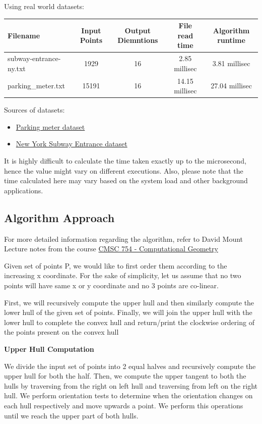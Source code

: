 Using real world datasets:

\begin{longtable}[]{@{}lcccc@{}}
\toprule
Filename & Input Points & Output Diemntions & File read time & Algorithm
runtime\tabularnewline
\midrule
\endhead
subway-entrance-ny.txt & 1929 & 16 & 2.85 millisec & 3.81
millisec\tabularnewline
parking\_meter.txt & 15191 & 16 & 14.15 millisec & 27.04
millisec\tabularnewline
\bottomrule
\end{longtable}

Sources of datasets:

\begin{itemize}
\tightlist
\item
  \href{https://data.world/city-of-ny/5jsj-cq4s}{Parking meter dataset}
\item
  \href{https://data.world/new-york-city/subway-entrances}{New York
  Subway Entrance dataset}
\end{itemize}

It is highly difficult to calculate the time taken exactly up to the
microsecond, hence the value might vary on different executions. Also,
please note that the time calculated here may vary based on the system
load and other background applications.

\hypertarget{algorithm-approach}{%
\subsection{Algorithm Approach}\label{algorithm-approach}}

For more detailed information regarding the algorithm, refer to David
Mount Lecture notes from the course
\href{https://www.cs.umd.edu/class/spring2020/cmsc754/lectures.html}{CMSC
754 - Computational Geometry}

Given set of points P, we would like to first order them according to
the increasing x coordinate. For the sake of simplicity, let us assume
that no two points will have same x or y coordinate and no 3 points are
co-linear.

First, we will recursively compute the upper hull and then similarly
compute the lower hull of the given set of points. Finally, we will join
the upper hull with the lower hull to complete the convex hull and
return/print the clockwise ordering of the points present on the convex
hull

\textbf{Upper Hull Computation}

We divide the input set of points into 2 equal halves and recursively
compute the upper hull for both the half. Then, we compute the upper
tangent to both the hulls by traversing from the right on left hull and
traversing from left on the right hull. We perform orientation tests to
determine when the orientation changes on each hull respectively and
move upwards a point. We perform this operations until we reach the
upper part of both hulls.

